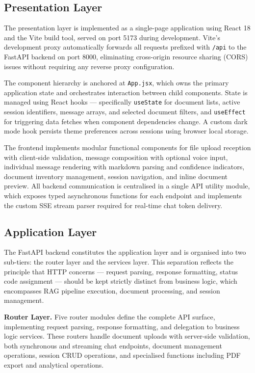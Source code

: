 \subsection{Presentation Layer}

The presentation layer is implemented as a single-page application using React 18 and the Vite build tool, served on port 5173 during development. Vite's development proxy automatically forwards all requests prefixed with \texttt{/api} to the FastAPI backend on port 8000, eliminating cross-origin resource sharing (CORS) issues without requiring any reverse proxy configuration.

The component hierarchy is anchored at \texttt{App.jsx}, which owns the primary application state and orchestrates interaction between child components. State is managed using React hooks --- specifically \texttt{useState} for document lists, active session identifiers, message arrays, and selected document filters, and \texttt{useEffect} for triggering data fetches when component dependencies change. A custom dark mode hook persists theme preferences across sessions using browser local storage.

The frontend implements modular functional components for file upload reception with client-side validation, message composition with optional voice input, individual message rendering with markdown parsing and confidence indicators, document inventory management, session navigation, and inline document preview. All backend communication is centralised in a single API utility module, which exposes typed asynchronous functions for each endpoint and implements the custom SSE stream parser required for real-time chat token delivery.

\subsection{Application Layer}

The FastAPI backend constitutes the application layer and is organised into two sub-tiers: the router layer and the services layer. This separation reflects the principle that HTTP concerns --- request parsing, response formatting, status code assignment --- should be kept strictly distinct from business logic, which encompasses RAG pipeline execution, document processing, and session management.

\textbf{Router Layer.} Five router modules define the complete API surface, implementing request parsing, response formatting, and delegation to business logic services. These routers handle document uploads with server-side validation, both synchronous and streaming chat endpoints, document management operations, session CRUD operations, and specialised functions including PDF export and analytical operations.

